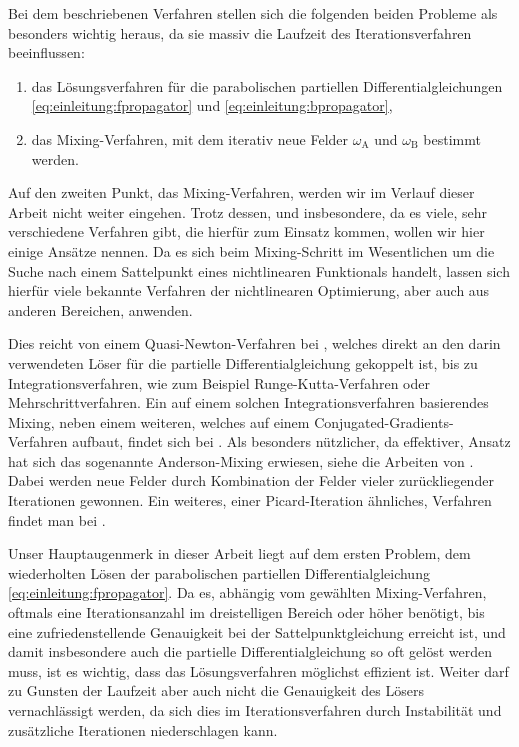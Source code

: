 Bei dem beschriebenen Verfahren stellen sich die folgenden beiden Probleme als besonders wichtig heraus, da sie massiv die Laufzeit des Iterationsverfahren beeinflussen:
\begin{enumerate}[label={\itshape\roman*.}]
    \item das Lösungsverfahren für die parabolischen partiellen Differentialgleichungen \eqref{eq:einleitung:fpropagator} und \eqref{eq:einleitung:bpropagator},
    \item das Mixing-Verfahren, mit dem iterativ neue Felder $\omega_{\mathrm{A}}$ und $\omega_{\mathrm{B}}$ bestimmt werden.
\end{enumerate}

Auf den zweiten Punkt, das Mixing-Verfahren, werden wir im Verlauf dieser Arbeit nicht weiter eingehen.
Trotz dessen, und insbesondere, da es viele, sehr verschiedene Verfahren gibt, die hierfür zum Einsatz kommen, wollen wir hier einige Ansätze nennen.
Da es sich beim Mixing-Schritt im Wesentlichen um die Suche nach einem Sattelpunkt eines nichtlinearen Funktionals handelt, lassen sich hierfür viele bekannte Verfahren der nichtlinearen Optimierung, aber auch aus anderen Bereichen, anwenden.

Dies reicht von einem Quasi-Newton-Verfahren bei \textcite{Matsen:1994bz}, welches direkt an den darin verwendeten Löser für die partielle Differentialgleichung gekoppelt ist, bis zu Integrationsverfahren, wie zum Beispiel Runge-Kutta-Verfahren oder Mehrschrittverfahren.
Ein auf einem solchen Integrationsverfahren basierendes Mixing, neben einem weiteren, welches auf einem Conjugated-Gradients-Verfahren aufbaut, findet sich bei \textcite{Ceniceros:2006is}.
Als besonders nützlicher, da effektiver, Ansatz hat sich das sogenannte Anderson-Mixing erwiesen, siehe die Arbeiten von \textcite{Thompson:2004um,Stasiak:2011ba}.
Dabei werden neue Felder durch Kombination der Felder vieler zurückliegender Iterationen gewonnen.
Ein weiteres, einer Picard-Iteration ähnliches, Verfahren findet man bei \textcite{Drolet:1999bs}.

Unser Hauptaugenmerk in dieser Arbeit liegt auf dem ersten Problem, dem wiederholten Lösen der parabolischen partiellen Differentialgleichung \eqref{eq:einleitung:fpropagator}.
Da es, abhängig vom gewählten Mixing-Verfahren, oftmals eine Iterationsanzahl im dreistelligen Bereich oder höher benötigt, bis eine zufriedenstellende Genauigkeit bei der Sattelpunktgleichung erreicht ist, und damit insbesondere auch die partielle Differentialgleichung so oft gelöst werden muss, ist es wichtig, dass das Lösungsverfahren möglichst effizient ist.
Weiter darf zu Gunsten der Laufzeit aber auch nicht die Genauigkeit des Lösers vernachlässigt werden, da sich dies im Iterationsverfahren durch Instabilität und zusätzliche Iterationen niederschlagen kann.

